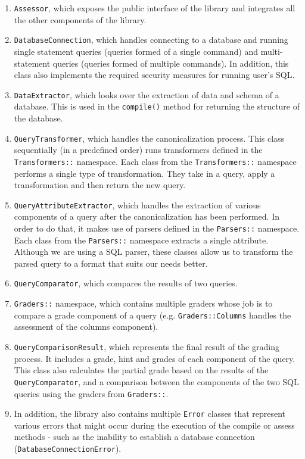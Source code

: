 \begin{enumerate}
    \item \texttt{Assessor}, which exposes the public interface of the library and integrates all the other components of the library.
    \item \texttt{DatabaseConnection}, which handles connecting to a database and running single statement queries (queries formed of a single command) and multi-statement queries (queries formed of multiple commands). In addition, this class also implements the required security measures for running user's SQL.
    \item \texttt{DataExtractor}, which looks over the extraction of data and schema of a database. This is used in the \texttt{compile()} method for returning the structure of the database.
    \item \texttt{QueryTransformer}, which handles the canonicalization process. This class sequentially (in a predefined order) runs transformers defined in the \texttt{Transformers::} namespace. Each class from the \texttt{Transformers::} namespace performs a single type of transformation. They take in a query, apply a transformation and then return the new query.
    \item \texttt{QueryAttributeExtractor}, which handles the extraction of various components of a query after the canonicalization has been performed. In order to do that, it makes use of parsers defined in the \texttt{Parsers::} namespace. Each class from the \texttt{Parsers::} namespace extracts a single attribute. Although we are using a SQL parser, these classes allow us to transform the parsed query to a format that suits our needs better.
    \item \texttt{QueryComparator}, which compares the results of two queries.
    \item \texttt{Graders::} namespace, which contains multiple graders whose job is to compare a grade component of a query (e.g. \texttt{Graders::Columns} handles the assessment of the columns component).
    \item \texttt{QueryComparisonResult}, which represents the final result of the grading process. It includes a grade, hint and grades of each component of the query. This class also calculates the partial grade based on the results of the \texttt{QueryComparator}, and a comparison between the components of the two SQL queries using the graders from \texttt{Graders::}.
    \item In addition, the library also contains multiple \texttt{Error} classes that represent various errors that might occur during the execution of the compile or assess methods - such as the inability to establish a database connection (\texttt{DatabaseConnectionError}).
\end{enumerate}

